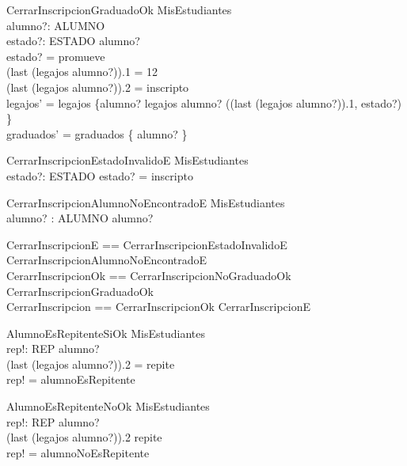 \begin{schema}{CerrarInscripcionGraduadoOk}
    \Delta MisEstudiantes \\
    alumno?: ALUMNO \\
    estado?: ESTADO
    \where
    alumno? \in {} \\
    estado? = promueve \\
    (last \; (legajos \; alumno?)).1 = 12 \\
    (last \; (legajos \; alumno?)).2 = inscripto \\
    legajos' = legajos \oplus \{alumno? \mapsto legajos \; alumno? \cat \langle ((last \; (legajos \; alumno?)).1, estado?) \rangle\} \\
    graduados' = graduados \cup \{ alumno? \}
\end{schema}

\begin{schema}{CerrarInscripcionEstadoInvalidoE}
    \Xi MisEstudiantes \\
    estado?: ESTADO
    \where
    estado? = inscripto
\end{schema}

\begin{schema}{CerrarInscripcionAlumnoNoEncontradoE}
    \Xi MisEstudiantes \\
    alumno? : ALUMNO
    \where
    alumno? \notin {}
\end{schema}

\begin{zed}
    CerrarInscripcionE == CerrarInscripcionEstadoInvalidoE \lor CerrarInscripcionAlumnoNoEncontradoE \\
    CerarrInscripcionOk == CerrarInscripcionNoGraduadoOk \lor CerrarInscripcionGraduadoOk \\
    CerrarInscripcion == CerrarInscripcionOk \lor CerrarInscripcionE
\end{zed}

\begin{schema}{AlumnoEsRepitenteSiOk}
    \Xi MisEstudiantes \\
    rep!: REP
    \where
    alumno? \in {} \\
    (last \; (legajos \; alumno?)).2 = repite \\
    rep! = alumnoEsRepitente
\end{schema}

\begin{schema}{AlumnoEsRepitenteNoOk}
    \Xi MisEstudiantes \\
    rep!: REP
    \where
    alumno? \in {} \\
    (last \; (legajos \; alumno?)).2 \neq repite \\
    rep! = alumnoNoEsRepitente
\end{schema}

